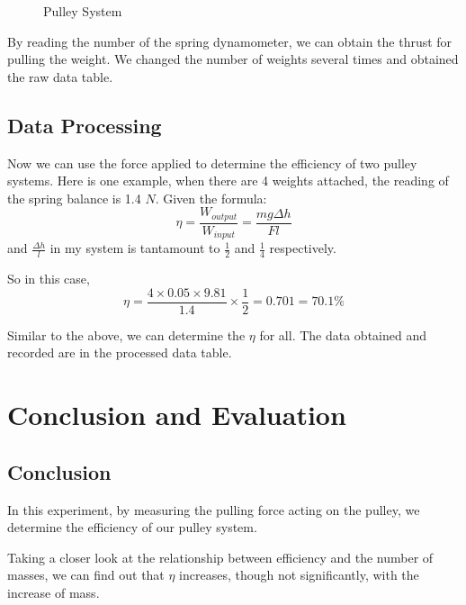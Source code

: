 \documentclass[12pt,a4paper]{article}
\begin{document}
\begin{spacing}{1.25}
\begin{figure}[h]
    \caption{Pulley System}
    \vspace{-0.5cm}
\end{figure}\par

By reading the number of the spring dynamometer, we can obtain the thrust for pulling the weight. We changed the number of weights several times and obtained the raw data table.
\subsection{Data Processing}
Now we can use the force applied to determine the efficiency of two pulley systems. Here is one example, when there are 4 weights attached, the reading of the spring balance is 1.4 $ N $. Given the formula:\[
    \eta = \frac{W_{output}}{W_{input}} = \frac{mg\Delta h}{Fl}
\]
and $ \frac{\Delta h}{l} $ in my system is tantamount to $ \frac{1}{2} $ and $ \frac{1}{4} $ respectively.\par
So in this case, \[
    \eta = \frac{4 \times 0.05 \times 9.81}{1.4} \times \frac{1}{2} = 0.701 = 70.1\%
\]\par
Similar to the above, we can determine the $ \eta $ for all. The data obtained and recorded are in the processed data table.\par
\section{Conclusion and Evaluation}
\subsection{Conclusion}
In this experiment, by measuring the pulling force acting on the pulley, we determine the efficiency of our pulley system.\par
Taking a closer look at the relationship between efficiency and the number of masses, we can find out that $ \eta $ increases, though not significantly, with the increase of mass.

\end{spacing}
\end{document}
